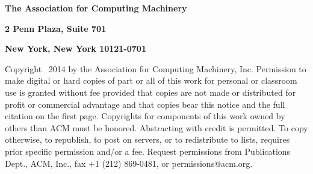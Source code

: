 \documentclass[10pt]{book}
\begin{document}








\newpage
\restoregeometry
\thispagestyle{empty}

\normalsize

\noindent \large \textbf{The Association for Computing Machinery}

\noindent \normalsize \textbf{2 Penn Plaza, Suite 701}

\noindent \textbf{New York, New York 10121-0701}

\vspace{.4cm}

\noindent Copyright \textcopyright ~2014 by the Association for Computing
Machinery, Inc. Permission to make digital or hard copies of part or all of
this work for personal or classroom use is granted without fee provided that
copies are not made or distributed for profit or commercial advantage and that
copies bear this notice and the full citation on the first page. Copyrights
for components of this work owned by others than ACM must be honored.
Abstracting with credit is permitted. To copy otherwise, to republish, to
post on servers, or to redistribute to lists, requires prior specific
permission and/or a fee. Request permissions from Publications Dept., ACM,
Inc., fax +1 (212) 869-0481, or permissions@acm.org.

\vspace{.2cm}
\end{document}
